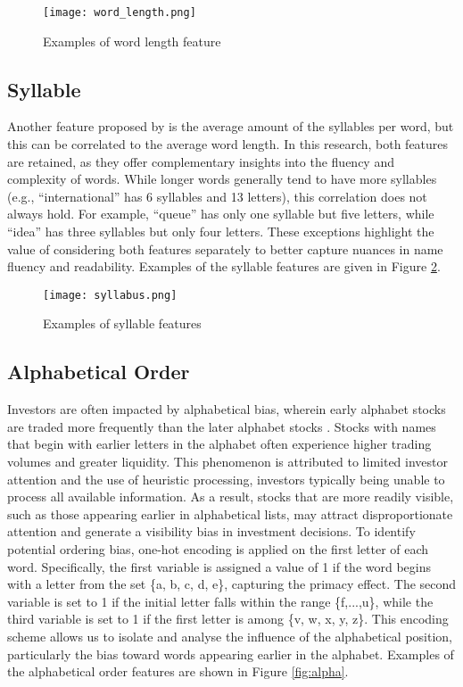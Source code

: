 \documentclass[a4paper,11pt]{report}
\begin{document}
\begin{figure}[h!]
    \centering
    \texttt{[image: word\_length.png]}
    \caption{Examples of word length feature}
    \label{fig:word_length}
\end{figure}

\subsection{Syllable}
Another feature proposed by  is the average amount of the syllables per word, but this can be correlated to the average word length. In this research, both features are retained, as they offer complementary insights into the fluency and complexity of words. While longer words generally tend to have more syllables (e.g., ``international'' has 6 syllables and 13 letters), this correlation does not always hold. For example, ``queue'' has only one syllable but five letters, while ``idea'' has three syllables but only four letters. These exceptions highlight the value of considering both features separately to better capture nuances in name fluency and readability. Examples of the syllable features are given in Figure \ref{fig:syllables}.

\begin{figure}[h!]
    \centering
    \texttt{[image: syllabus.png]}
    \caption{Examples of syllable features}
    \label{fig:syllables}
\end{figure}

\subsection{Alphabetical Order}
Investors are often impacted by alphabetical bias, wherein early alphabet stocks are traded more frequently than the later alphabet stocks \cite{alpha, AlphabeticBias}. Stocks with names that begin with earlier letters in the alphabet often experience higher trading volumes and greater liquidity. This phenomenon is attributed to limited investor attention and the use of heuristic processing, investors typically being unable to process all available information. As a result, stocks that are more readily visible, such as those appearing earlier in alphabetical lists, may attract disproportionate attention and generate a visibility bias in investment decisions. To identify potential ordering bias, one-hot encoding is applied on the first letter of each word. Specifically, the first variable is assigned a value of 1 if the word begins with a letter from the set \{a, b, c, d, e\}, capturing the primacy effect. The second variable is set to 1 if the initial letter falls within the range \{f,...,u\}, while the third variable is set to 1 if the first letter is among \{v, w, x, y, z\}. This encoding scheme allows us to isolate and analyse the influence of the alphabetical position, particularly the bias toward words appearing earlier in the alphabet. Examples of the alphabetical order features are shown in Figure \ref{fig:alpha}.
\end{document}
